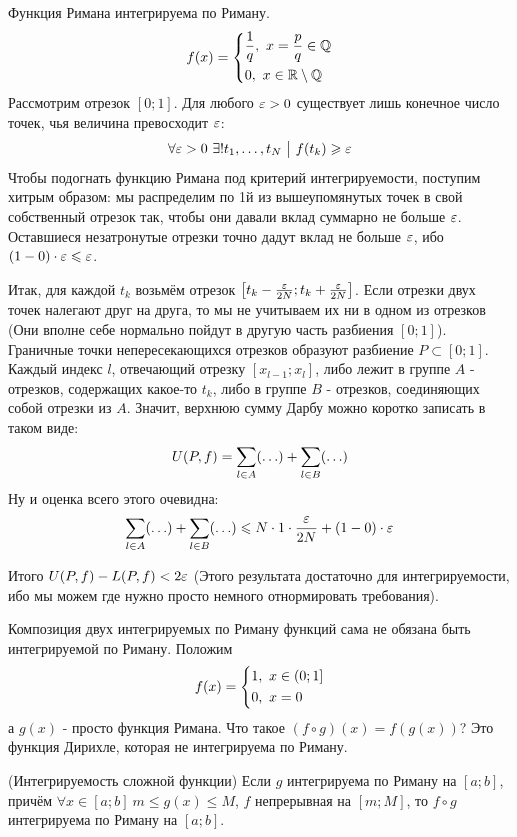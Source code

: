 \begin{example}
	Функция Римана интегрируема по Риману.
		\[
	f(x) = \left\{\begin{aligned}
		&\frac{1}{q},\ x = \frac{p}{q} \in\mathbb{Q}
		\\
		&0,\ x\in \mathbb{R} \setminus \mathbb{Q}
	\end{aligned}\right.
	\]
	Рассмотрим отрезок $[0;1]$. Для любого $\varepsilon > 0$ существует лишь конечное число точек, чья величина превосходит $\varepsilon$:
	\[
		\forall \varepsilon > 0\ \exists! t_1, \ldots, t_N \ \big|\  f(t_k) \geqslant \varepsilon
	\]
	Чтобы подогнать функцию Римана под критерий интегрируемости, поступим хитрым образом: мы распределим по 1й из вышеупомянутых точек в свой собственный отрезок так, чтобы они давали вклад суммарно не больше $\varepsilon$. Оставшиеся незатронутые отрезки точно дадут вклад не больше $\varepsilon$, ибо $(1 - 0) \cdot \varepsilon \leqslant \varepsilon$.
	
	Итак, для каждой $t_k$ возьмём отрезок $\left[t_k - \frac{\varepsilon}{2N}; t_k + \frac{\varepsilon}{2N}\right]$. Если отрезки двух точек налегают друг на друга, то мы не учитываем их ни в одном из отрезков (Они вполне себе нормально пойдут в другую часть разбиения $[0; 1]$). Граничные точки непересекающихся отрезков образуют разбиение $P \subset [0; 1]$. Каждый индекс $l$, отвечающий отрезку $[x_{l - 1}; x_l]$, либо лежит в группе $A$ - отрезков, содержащих какое-то $t_k$, либо в группе $B$ - отрезков, соединяющих собой отрезки из $A$. Значит, верхнюю сумму Дарбу можно коротко записать в таком виде:
	\[
		U(P, f) = \sum\limits_{l \in A} (\ldots) + \sum\limits_{l \in B} (\ldots)
	\]
	Ну и оценка всего этого очевидна:
	\[
		\sum\limits_{l \in A} (\ldots) + \sum\limits_{l \in B} (\ldots) \leqslant N \cdot 1 \cdot \frac{\varepsilon}{2N} + (1 - 0) \cdot \varepsilon
	\]
	
	Итого $U(P, f) - L(P, f) < 2\varepsilon$ (Этого результата достаточно для интегрируемости, ибо мы можем где нужно просто немного отнормировать требования).
\end{example}

\begin{example}
	Композиция двух интегрируемых по Риману функций сама не обязана быть интегрируемой по Риману. Положим
	\[
		f(x) = \left\{\begin{aligned}
			&{1,\ x \in (0; 1]}
			\\
			&{0,\ x = 0}
		\end{aligned}\right.
	\]
	а $g(x)$ - просто функция Римана. Что такое $(f \circ g)(x) = f(g(x))$? Это функция Дирихле, которая не интегрируема по Риману.
\end{example}

\begin{theorem} (Интегрируемость сложной функции)
	Если $g$ интегрируема по Риману на $[a; b]$, причём $\forall x \in [a; b]\ m \le g(x) \le M$, $f$ непрерывная на $[m; M]$, то $f \circ g$ интегрируема по Риману на $[a; b]$.
\end{theorem}

